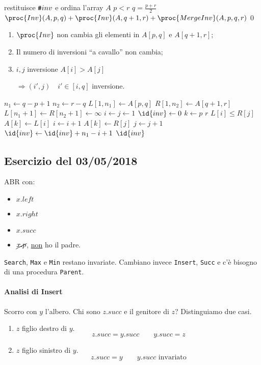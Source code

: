 \begin{codebox}
\zi \Comment restituisce $\verb|#| inv$ e ordina l'array $A$
\li \If $p < r$ 
\li \Then
		$q = \frac{p+r}{2}$
\li		\Return $\proc{Inv}(A,p,q) + \proc{Inv}(A,q+1,r) + \proc{MergeInv}(A,p,q,r)$
\li	\Else
\li		\Return $0$
	\End
\end{codebox}

\begin{enumerate}[label=($\alph*$)]
	\item $\proc{Inv}$ non cambia gli elementi in $A[p,q]$ e $A[q+1,r]$;
	\item Il numero di inversioni ``a cavallo'' non cambia;
	\item $i,j$ inversione $A[i] > A[j]$ \par
		$\Rightarrow (i',j) \quad i' \in [i,q]$ inversione. 
\end{enumerate}

\begin{codebox}
\li $n_1 \gets q - p + 1$
\li $n_2 \gets r - q$
\li $L[1,n_1] \gets A[p,q]$
\li $R[1,n_2] \gets A[q+1,r]$
\li $L[n_1+1] \gets R[n_2+1] \gets \infty$
\li $i \gets j \gets 1$
\li $\id{inv} \gets 0$
\li \For $k \gets p$ \To $r$
\li \Do
		\If $L[i] \leq R[j]$
\li		\Then
			$A[k] \gets L[i]$
\li 		$i \gets i + 1$
\li 	\Else
\li 		$A[k] \gets R[j]$
\li 		$j \gets j + 1$
\li 		$\id{inv} \gets \id{inv} + n_1 - i + 1$ 
		\End
	\End
\li \Return $\id{inv}$
\end{codebox}

\subsection{Esercizio del 03/05/2018} \label{exs:3-5-2018}

ABR con:
\begin{itemize}[noitemsep]
	\item $x.left$
	\item $x.right$
	\item $x.succ$
	\item $\cancel{x.p}$, \underline{non} ho il padre.
\end{itemize}

\texttt{Search}, \texttt{Max} e \texttt{Min} restano invariate. Cambiano invece 
\texttt{Insert}, \texttt{Succ} e c'è bisogno di una procedura \texttt{Parent}.



\paragraph{Analisi di Insert} Scorro con $y$ l'albero.
Chi sono $z.succ$ e il genitore di $z$? Distinguiamo due casi.
\begin{enumerate}[label=$\alph*$)]
	\item $z$ figlio destro di $y$. 
		$$z.succ = y.succ \qquad y.succ = z$$
	\item $z$ figlio sinistro di $y$.	
		$$z.succ = y \qquad y.succ \text{ invariato}$$
\end{enumerate}

